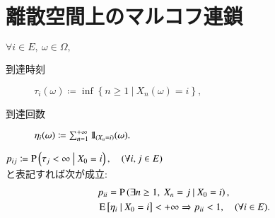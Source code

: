 \section{離散空間上のマルコフ連鎖}
	\begin{dfn}[到達時刻と到達回数]
		$\forall i \in E,\ \omega \in \Omega,$
		\begin{description}
			\item[到達時刻] $\tau_i(\omega) \coloneqq \inf{}{\left\{ n \geq 1\ \left|\ X_n(\omega) = i \right.\right\}},$
			\item[到達回数] $\eta_i(\omega) \coloneqq \sum_{n=1}^{+\infty} \mbox{1}\hspace{-0.25em}\mbox{l}_{(X_n = i)}(\omega).$
		\end{description}
	\end{dfn}
	$p_{ij} \coloneqq \operatorname{P} \left( \tau_j < \infty \ \middle|\ X_0 = i \right), \quad (\forall i,j \in E)$\\
	と表記すれば次が成立:
	\begin{align}
		&p_{ii} = \operatorname{P} \left( \exists n \geq 1,\ X_n = j \ \middle|\ X_0 = i \right), \label{eq:mcmc_hit_1} \\
		&\operatorname{E} \left[ \eta_i \ \middle|\ X_0 = i \right] < +\infty \Rightarrow p_{ii} < 1, \quad (\forall i \in E). \label{eq:mcmc_hit_2}
	\end{align}
